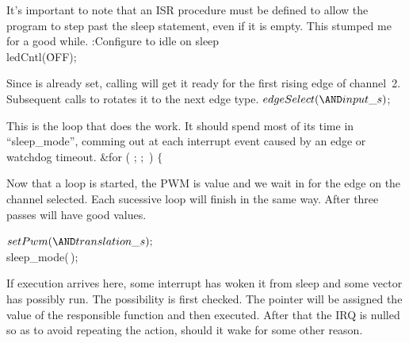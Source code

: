 It's important to note that an ISR procedure must be defined to allow the
program to step past the sleep statement, even if it is empty.
This stumped me for a good while.
\Y\B{}:Configure to idle on sleep\X\7
\\{ledCntl}(\.{OFF});\par
\fi

Since  is already set, calling  will get
it ready for
the first rising edge of channel~2.
Subsequent calls to  rotates it to the next edge type.
\Y\B$\\{edgeSelect}({\AND}\\{input\_s}){}$;\par
\fi

This is the loop that does the work.
It should spend most of its time in ``sleep\_mode'', comming out at each
interrupt event caused by an edge or watchdog timeout.
\Y\B\&{for} ( ;  ; \,) $\{{}$\Y\par
\fi

Now that a loop is started, the PWM is value and we wait in
 for the edge on the channel selected. Each sucessive loop will
finish
in the same way.
After three passes  will have good values.

\Y\B$\\{setPwm}({\AND}\\{translation\_s});{}$\6
\\{sleep\_mode}(\,);\par
\fi

If execution arrives here, some interrupt has woken it from sleep and some
vector has possibly run. The possibility is first checked.
The pointer  will be assigned the value of the responsible
function and then executed.
After that the IRQ is nulled so as to avoid repeating the action, should it
wake for some other reason.


